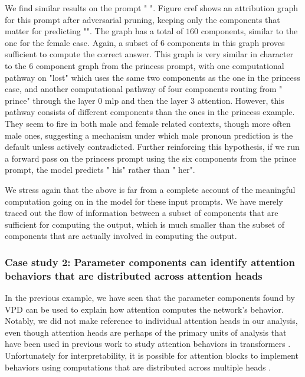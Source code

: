 \documentclass{article}
\begin{document}
We find similar results on the prompt "     ". Figure cref shows an attribution graph for this prompt after adversarial pruning, keeping only the components that matter for predicting "". The graph has a total of $160$ components, similar to the one for the female case. Again, a subset of $6$ components in this graph proves sufficient to compute the correct answer. This graph is very similar in character to the $6$ component graph from the princess prompt, with one computational pathway on "lost" which uses the same two components as the one in the princess case, and another computational pathway of four components routing from " prince" through the layer $0$ mlp and then the layer $3$ attention. However, this pathway consists of different components than the ones in the princess example. They seem to fire in both male and female related contexts, though more often male ones, suggesting a mechanism under which male pronoun prediction is the default unless actively contradicted. Further reinforcing this hypothesis, if we run a forward pass on the princess prompt using the six components from the prince prompt, the model predicts " his" rather than " her".

We stress again that the above is far from a complete account of the meaningful computation going on in the model for these input prompts. We have merely traced out the flow of information between a subset of components that are sufficient for computing the output, which is much smaller than the subset of components that are actually involved in computing the output.


\subsubsection{Case study 2: Parameter components can identify attention behaviors that are distributed across attention heads}

In the previous example, we have seen that the parameter components found by VPD can be used to explain how attention computes the network's behavior. Notably, we did not make reference to individual attention heads in our analysis, even though attention heads are perhaps of the primary units of analysis that have been used in previous work to study attention behaviors in transformers \citep{vig2019multiscalevis, clark2019doesbertlookat, elhage2021mathematical, olsson2022incontextlearninginductionheads, wang2022interpretability, janiak2023polysemantic, nam2025causalheadgatingframework}. Unfortunately for interpretability, it is possible for attention blocks to implement behaviors using computations that are distributed across multiple heads \cite{jermyn2023attention, jermyn2025attention}. 
\end{document}
